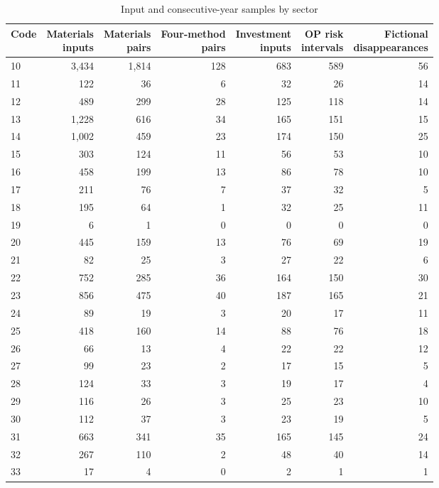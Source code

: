\begin{table}[H]
\centering
\caption{Input and consecutive-year samples by sector}
\begingroup\fontsize{9.2}{11.2}\selectfont
\setlength{\tabcolsep}{4.3pt}\renewcommand{\arraystretch}{1.1}
\begin{tabular}{lrrrrrr}
\toprule
Code & \makecell{Materials\\inputs} & \makecell{Materials\\pairs} & \makecell{Four-method\\pairs} & \makecell{Investment\\inputs} & \makecell{OP risk\\intervals} & \makecell{Fictional\\disappearances} \\
\midrule
10 & 3,434 & 1,814 & 128 & 683 & 589 & 56 \\
11 & 122 & 36 & 6 & 32 & 26 & 14 \\
12 & 489 & 299 & 28 & 125 & 118 & 14 \\
13 & 1,228 & 616 & 34 & 165 & 151 & 15 \\
14 & 1,002 & 459 & 23 & 174 & 150 & 25 \\
15 & 303 & 124 & 11 & 56 & 53 & 10 \\
16 & 458 & 199 & 13 & 86 & 78 & 10 \\
17 & 211 & 76 & 7 & 37 & 32 & 5 \\
18 & 195 & 64 & 1 & 32 & 25 & 11 \\
19 & 6 & 1 & 0 & 0 & 0 & 0 \\
20 & 445 & 159 & 13 & 76 & 69 & 19 \\
21 & 82 & 25 & 3 & 27 & 22 & 6 \\
22 & 752 & 285 & 36 & 164 & 150 & 30 \\
23 & 856 & 475 & 40 & 187 & 165 & 21 \\
24 & 89 & 19 & 3 & 20 & 17 & 11 \\
25 & 418 & 160 & 14 & 88 & 76 & 18 \\
26 & 66 & 13 & 4 & 22 & 22 & 12 \\
27 & 99 & 23 & 2 & 17 & 15 & 5 \\
28 & 124 & 33 & 3 & 19 & 17 & 4 \\
29 & 116 & 26 & 3 & 25 & 23 & 10 \\
30 & 112 & 37 & 3 & 23 & 19 & 5 \\
31 & 663 & 341 & 35 & 165 & 145 & 24 \\
32 & 267 & 110 & 2 & 48 & 40 & 14 \\
33 & 17 & 4 & 0 & 2 & 1 & 1 \\

\end{tabular}
\end{table}
